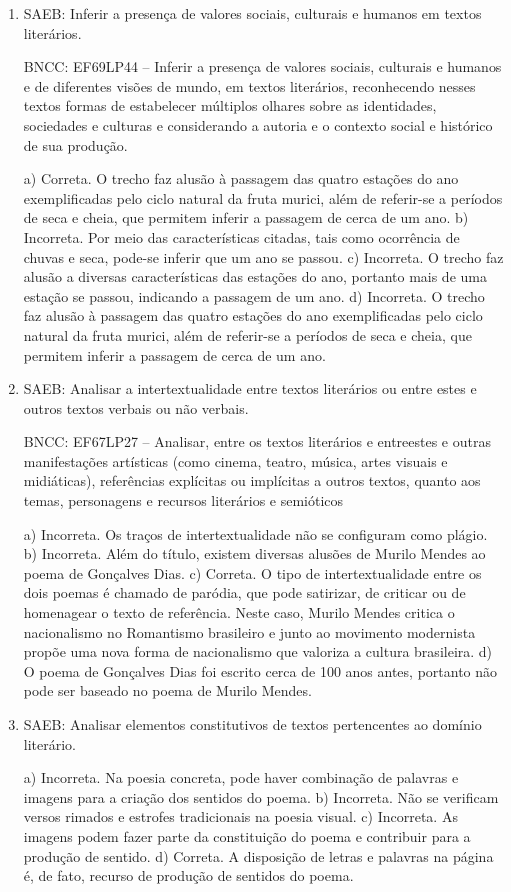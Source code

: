 \begin{enumerate}

\item
SAEB: Inferir a presença de valores sociais, culturais e humanos em
textos literários.

BNCC: EF69LP44 -- Inferir a presença de valores sociais,
culturais e humanos e de diferentes visões de mundo, em textos
literários, reconhecendo nesses textos formas de estabelecer múltiplos
olhares sobre as identidades, sociedades e culturas e considerando a
autoria e o contexto social e histórico de sua produção.

a) Correta. O trecho faz alusão à passagem das quatro estações do ano
exemplificadas pelo ciclo natural da fruta murici, além de referir-se
a períodos de seca e cheia, que permitem inferir a passagem de cerca de um ano.
b) Incorreta. Por meio das características citadas, tais como ocorrência
de chuvas e seca, pode-se inferir que um ano se passou.
c) Incorreta. O trecho faz alusão a diversas características das estações
do ano, portanto mais de uma estação se passou, indicando a passagem
de um ano.
d) Incorreta. O trecho faz alusão à passagem das quatro estações do ano
exemplificadas pelo ciclo natural da fruta murici, além de referir-se
a períodos de seca e cheia, que permitem inferir a passagem de cerca de um ano.

\item
SAEB: Analisar a intertextualidade entre textos literários ou entre
estes e outros textos verbais ou não verbais.

BNCC: EF67LP27 -- Analisar, entre os textos literários e entreestes e outras manifestações artísticas (como cinema, teatro, música,
artes visuais e midiáticas), referências explícitas ou implícitas a
outros textos, quanto aos temas, personagens e recursos literários e
semióticos

a) Incorreta. Os traços de intertextualidade não se configuram como plágio.
b) Incorreta. Além do título, existem diversas alusões de Murilo Mendes ao 
poema de Gonçalves Dias.
c) Correta. O tipo de intertextualidade entre os dois poemas é chamado de
paródia, que pode satirizar, de criticar ou de homenagear o texto de referência.
Neste caso, Murilo Mendes critica o nacionalismo no Romantismo
brasileiro e junto ao movimento modernista propõe uma nova forma de
nacionalismo que valoriza a cultura brasileira.
d)  O poema de Gonçalves Dias foi escrito cerca de 100 anos antes,
portanto não pode ser baseado no poema de Murilo Mendes.

\item
SAEB: Analisar elementos constitutivos de textos pertencentes ao domínio
literário.

a) Incorreta. Na poesia concreta, pode haver combinação de palavras e imagens 
para a criação dos sentidos do poema.
b) Incorreta. Não se verificam versos rimados e estrofes tradicionais na poesia
visual. 
c) Incorreta. As imagens podem fazer parte da constituição do poema e contribuir
para a produção de sentido.
d) Correta. A disposição de letras e palavras na página é, de fato, recurso de
produção de sentidos do poema.

\end{enumerate}


